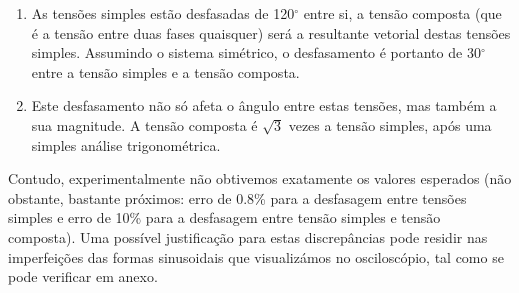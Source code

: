 \begin{enumerate}
    \item As tensões simples estão desfasadas de 120$^{\circ}$ entre si, a tensão composta (que é a tensão entre duas fases quaisquer) será a resultante vetorial destas tensões simples. Assumindo o sistema simétrico, o desfasamento é portanto de 30$^{\circ}$ entre a tensão simples e a tensão composta.
    \item Este desfasamento não só afeta o ângulo entre estas tensões, mas também a sua magnitude. A tensão composta é $\sqrt{3}$ vezes a tensão simples, após uma simples análise trigonométrica.
\end{enumerate}

\noindent Contudo, experimentalmente não obtivemos exatamente os valores esperados (não obstante, bastante próximos: erro de 0.8\% para a desfasagem entre tensões simples e erro de 10\% para a desfasagem entre tensão simples e tensão composta). Uma possível justificação para estas discrepâncias pode residir nas imperfeições das formas sinusoidais que visualizámos no osciloscópio, tal como se pode verificar em anexo.
